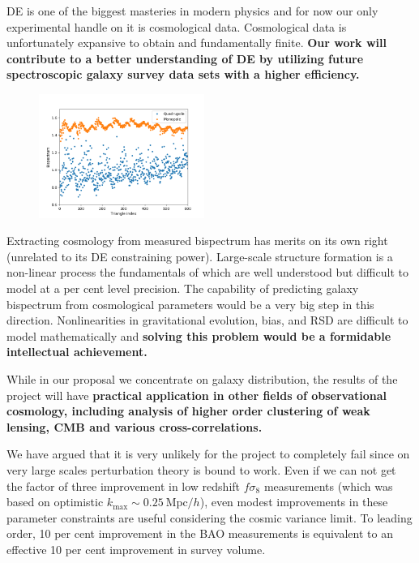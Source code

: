 DE is one of the biggest masteries in modern physics and for now our only
experimental handle on it is cosmological data. Cosmological data is
unfortunately expansive to obtain and fundamentally finite. \textbf{Our work
will contribute to a better understanding of DE by utilizing future
spectroscopic galaxy survey data sets with a higher efficiency.} 

\begin{figure}
\begin{center}
\includegraphics[width=0.48\textwidth]{MonQuad.png}
\end{center}
\end{figure}


Extracting cosmology from measured bispectrum has merits on its own right
(unrelated to its DE constraining power). Large-scale structure formation is a
non-linear process the fundamentals of which are well understood but difficult
to model at a per cent level precision. The capability of predicting galaxy
bispectrum from cosmological parameters would be a very big step in this
direction. Nonlinearities in gravitational evolution, bias, and RSD are
difficult to model mathematically and \textbf{solving this problem would be a
formidable intellectual achievement.}

While in our proposal we concentrate on galaxy distribution, the results of the
project will have \textbf{practical application in other fields of observational
cosmology, including analysis of higher order clustering of weak lensing, CMB
and various cross-correlations.}

We have argued that it is very unlikely for the project to completely fail
since on very large scales perturbation theory is bound to work. Even if we can
not get the factor of three improvement in low redshift $f\sigma_8$
measurements (which was based on optimistic $k_\mathrm{max}\sim 0.25\
\mathrm{Mpc}/h$), even modest improvements in these parameter constraints
are useful considering the cosmic variance limit. To leading order, 10 per cent
improvement in the BAO measurements is equivalent to an effective 10 per cent 
improvement in survey volume.

